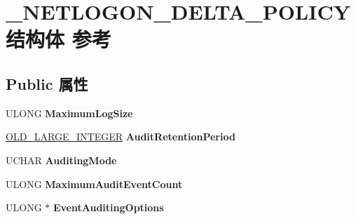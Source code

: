 \hypertarget{struct___n_e_t_l_o_g_o_n___d_e_l_t_a___p_o_l_i_c_y}{}\section{\+\_\+\+N\+E\+T\+L\+O\+G\+O\+N\+\_\+\+D\+E\+L\+T\+A\+\_\+\+P\+O\+L\+I\+C\+Y结构体 参考}
\label{struct___n_e_t_l_o_g_o_n___d_e_l_t_a___p_o_l_i_c_y}
\subsection*{Public 属性}
\begin{DoxyCompactItemize}
\item 
\mbox{\label{struct___n_e_t_l_o_g_o_n___d_e_l_t_a___p_o_l_i_c_y_a59eaf312c76c41d34805c02b2cd21bcb}} 
U\+L\+O\+NG {\bfseries Maximum\+Log\+Size}
\item 
\mbox{\label{struct___n_e_t_l_o_g_o_n___d_e_l_t_a___p_o_l_i_c_y_ab978261f0c51f06e82fff34c10f6651e}} 
\hyperlink{struct___o_l_d___l_a_r_g_e___i_n_t_e_g_e_r}{O\+L\+D\+\_\+\+L\+A\+R\+G\+E\+\_\+\+I\+N\+T\+E\+G\+ER} {\bfseries Audit\+Retention\+Period}
\item 
\mbox{\label{struct___n_e_t_l_o_g_o_n___d_e_l_t_a___p_o_l_i_c_y_a22d9d67ef64692f452c5b69399e79d02}} 
U\+C\+H\+AR {\bfseries Auditing\+Mode}
\item 
\mbox{\label{struct___n_e_t_l_o_g_o_n___d_e_l_t_a___p_o_l_i_c_y_acfb44cf328f5e03b653ec4b9001251e0}} 
U\+L\+O\+NG {\bfseries Maximum\+Audit\+Event\+Count}
\item 
\mbox{\label{struct___n_e_t_l_o_g_o_n___d_e_l_t_a___p_o_l_i_c_y_aae63e3c453c2e7ef2585affd997d2fb4}} 
U\+L\+O\+NG $\ast$ {\bfseries Event\+Auditing\+Options}
\item 
\mbox{\label{struct___n_e_t_l_o_g_o_n___d_e_l_t_a___p_o_l_i_c_y_a25dc1ce5c041b51a477ad2495ab2260f}} 

\end{DoxyCompactItemize}
